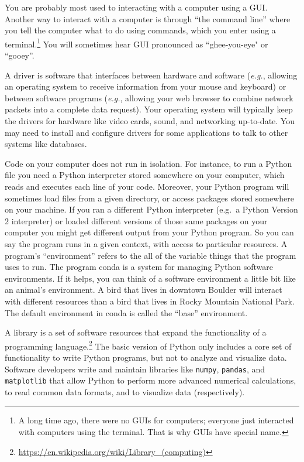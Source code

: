 \begin{description}[noitemsep]
    You are probably most used to interacting with a computer using a GUI. Another way to interact with a computer is through ``the command line'' where you tell the computer what to do using commands, which you enter using a terminal.\footnote{A long time ago, there were no GUIs for computers; everyone just interacted with computers using the terminal. That is why GUIs have special name.} You will sometimes hear GUI pronounced as ``ghee-you-eye" or ``gooey''.
    \item[Driver.] A driver is software that interfaces between hardware and software (\textit{e.g.}, allowing an operating system to receive information from your mouse and keyboard) or between software programs (\textit{e.g.}, allowing your web browser to combine network packets into a complete data request). Your operating system will typically keep the drivers for hardware like video cards, sound, and networking up-to-date. You may need to install and configure drivers for some applications to talk to other systems like databases.
    \item[Environment.] Code on your computer does not run in isolation. For instance, to run a Python file you need a Python interpreter stored somewhere on your computer, which reads and executes each line of your code. Moreover, your Python program will sometimes load files from a given directory, or access packages stored somewhere on your machine. If you ran a different Python interpreter (e.g.\ a Python Version 2 interpreter) or loaded different versions of those same packages on your computer you might get different output from your Python program. So you can say the program runs in a given context, with access to particular resources. A program's ``environment'' refers to the all of the variable things that the program uses to run. The program conda is a system for managing Python software environments. If it helps, you can think of a software environment a little bit like an animal's environment. A bird that lives in downtown Boulder will interact with different resources than a bird that lives in Rocky Mountain National Park. The default environment in conda is called the ``base'' environment.
    \item[Library.] A library is a set of software resources that expand the functionality of a programming language.\footnote{\url{https://en.wikipedia.org/wiki/Library_(computing)}} The basic version of Python only includes a core set of functionality to write Python programs, but not to analyze and visualize data. Software developers write and maintain libraries like \texttt{numpy}, \texttt{pandas}, and \texttt{matplotlib} that allow Python to perform more advanced numerical calculations, to read common data formats, and to visualize data (respectively).

\end{description}
